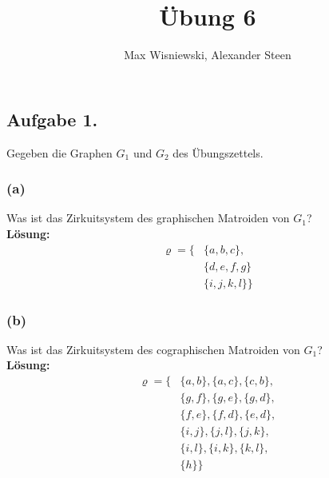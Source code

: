 \documentclass[11pt,a4paper,ngerman]{article}
\date{}
\title{Übung 6}
\author{Max Wisniewski, Alexander Steen}
\begin{document}

\renewcommand{\figurename}{Figure}

\maketitle
\thispagestyle{fancy}

\subsection*{Aufgabe 1.}

Gegeben die Graphen $G_1$ und $G_2$ des Übungszettels.

\subsubsection*{(a)}
Was ist das Zirkuitsystem des graphischen Matroiden von $G_1$?\\

\textbf{Lösung:}\\

\begin{equation*}\begin{split}
    \varrho = \{ 
            & \{a,b,c\},\\
            & \{ d , e, f, g \}\\
            & \{ i , j , k , l\}\}
\end{split}\end{equation*}

\subsubsection*{(b)}
Was ist das Zirkuitsystem des cographischen Matroiden von $G_1$?\\

\textbf{Lösung:}\\

\begin{equation*}\begin{split}
    \varrho = \{ 
        & \{ a , b \}, \{ a , c \}, \{ c , b \}, \\
        & \{ g , f \}, \{ g , e \}, \{ g , d \}, \\
        & \{ f , e \}, \{ f , d \}, \{ e , d \}, \\
        & \{ i , j \}, \{ j , l \}, \{ j , k \}, \\
        & \{ i , l \}, \{ i , k \}, \{ k , l \}, \\
        & \{ h \} \}
\end{split}\end{equation*}
\end{document}
